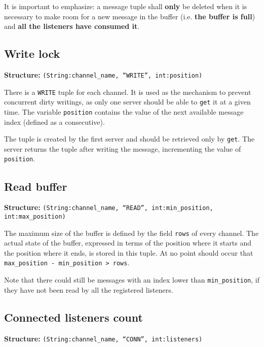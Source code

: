 \documentclass[paper=a4, fontsize=11pt]{scrartcl} %
\begin{document}
It is important to emphasize: a message tuple shall \textbf{only} be deleted when it is necessary to make room for a new message in the buffer (i.e. \textbf{the buffer is full}) and \textbf{all the listeners have consumed it}.


\subsection{Write lock}
\textbf{Structure:} \texttt{(String:channel\_name, ``WRITE'', int:position)}

There is a \verb|WRITE| tuple for each channel. It is used as the mechanism to prevent concurrent dirty writings, as only one server should be able to \verb|get| it at a given time. The variable \verb|position| contains the value of the next available message index (defined as a consecutive).

The tuple is created by the first server and should be retrieved only by \verb|get|. The server returns the tuple after writing the message, incrementing the value of \verb|position|.

\subsection{Read buffer}
\textbf{Structure:} \texttt{(String:channel\_name, ``READ'', int:min\_position, int:max\_position)}

The maximum size of the buffer is defined by the field \verb|rows| of every channel. The actual state of the buffer, expressed in terms of the position where it starts and the position where it ends, is stored in this tuple. At no point should occur that \texttt{max\_position - min\_position > rows}.

Note that there could still be messages with an index lower than \texttt{min\_position}, if they have not been read by all the registered listeners.

\subsection{Connected listeners count}
\textbf{Structure:} \texttt{(String:channel\_name, ``CONN'', int:listeners)}
\end{document}
